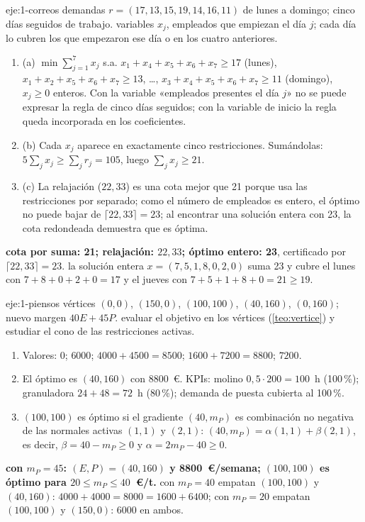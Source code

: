 \begin{solucion}{eje:1-correos}
\datos demandas $r=(17,13,15,19,14,16,11)$ de lunes a domingo; cinco días seguidos de trabajo.
\planteamiento variables $x_j$, empleados que empiezan el día $j$; cada día lo cubren los que empezaron ese día o en los cuatro anteriores.
\pasos
\begin{enumerate}[label=\arabic*.]
  \item (a) $\min\sum_{j=1}^{7}x_j$ s.a. $x_1+x_4+x_5+x_6+x_7\ge 17$ (lunes), $x_1+x_2+x_5+x_6+x_7\ge 13$, \dots, $x_3+x_4+x_5+x_6+x_7\ge 11$ (domingo), $x_j\ge 0$ enteros. Con la variable «empleados presentes el día $j$» no se puede expresar la regla de cinco días seguidos; con la variable de inicio la regla queda incorporada en los coeficientes.
  \item (b) Cada $x_j$ aparece en exactamente cinco restricciones. Sumándolas: $5\sum_jx_j\ge\sum_jr_j=105$, luego $\sum_jx_j\ge 21$.
  \item (c) La relajación ($22{,}33$) es una cota mejor que 21 porque usa las restricciones por separado; como el número de empleados es entero, el óptimo no puede bajar de $\lceil 22{,}33\rceil=23$; al encontrar una solución entera con 23, la cota redondeada demuestra que es óptima.
\end{enumerate}
\resultado \textbf{cota por suma: 21; relajación: $22{,}33$; óptimo entero: 23}, certificado por $\lceil 22{,}33\rceil=23$.
\comprobacion la solución entera $x=(7,5,1,8,0,2,0)$ suma 23 y cubre el lunes con $7+8+0+2+0=17$ y el jueves con $7+5+1+8+0=21\ge 19$.
\end{solucion}

\begin{solucion}{eje:1-piensos}
\datos vértices $(0,0)$, $(150,0)$, $(100,100)$, $(40,160)$, $(0,160)$; nuevo margen $40E+45P$.
\planteamiento evaluar el objetivo en los vértices (\cref{teo:vertice}) y estudiar el cono de las restricciones activas.
\pasos
\begin{enumerate}[label=\arabic*.]
  \item Valores: $0$; $6000$; $4000+4500=8500$; $1600+7200=8800$; $7200$.
  \item El óptimo es $(40,160)$ con 8800~€. KPIs: molino $0{,}5\cdot 200=100$~h (100\,\%); granuladora $24+48=72$~h (80\,\%); demanda de puesta cubierta al 100\,\%.
  \item $(100,100)$ es óptimo si el gradiente $(40,m_P)$ es combinación no negativa de las normales activas $(1,1)$ y $(2,1)$: $(40,m_P)=\alpha(1,1)+\beta(2,1)$, es decir, $\beta=40-m_P\ge 0$ y $\alpha=2m_P-40\ge 0$.
\end{enumerate}
\resultado \textbf{con $m_P=45$: $(E,P)=(40,160)$ y 8800~€/semana; $(100,100)$ es óptimo para $20\le m_P\le 40$~€/t.}
\comprobacion con $m_P=40$ empatan $(100,100)$ y $(40,160)$: $4000+4000=8000=1600+6400$; con $m_P=20$ empatan $(100,100)$ y $(150,0)$: $6000$ en ambos.
\end{solucion}

